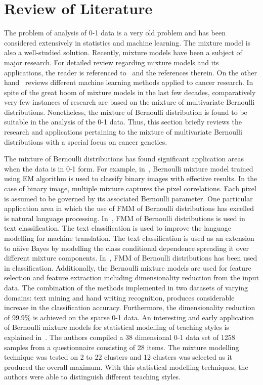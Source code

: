 \section[Review of Literature on Copy Number Analysis]{Review of Literature}
\label{s:mmbd}
The problem of analysis of 0-1 data is a very old problem and has been considered extensively in statistics and machine learning. The mixture model is also a well-studied solution. Recently, mixture models have been a subject of major research. For detailed review regarding mixture models and its applications, the reader is referenced to~\cite{mclachlanfmm, mixmodelsreview} and the references therein. On the other hand~\cite{thatreviewarticle} reviews different machine learning methods applied to cancer research. In spite of the great boom of mixture models in the last few decades, comparatively very few instances of research are based on the mixture of multivariate Bernoulli distributions. Nonetheless, the mixture of Bernoulli distribution is found to be suitable in the analysis of the 0-1 data. Thus, this section briefly reviews the research and applications pertaining to the mixture of multivariate Bernoulli distributions with a special focus on cancer genetics. 

The mixture of Bernoulli distributions has found significant application areas when the data is in 0-1 form. For example, in~\cite{binaryimages}, Bernoulli mixture model trained using EM algorithm is used to classify binary images with effective results. In the case of binary image, multiple mixture captures the pixel correlations. Each pixel is assumed to be governed by its associated Bernoulli parameter. One particular application area in which the use of FMM of Bernoulli distributions has excelled is natural language processing. In~\cite{textclassification}, FMM of Bernoulli distributions is used in text classification. The text classification is used to improve the language modelling for machine translation. The text classification is used as an extension to näive Bayes by modelling the class conditional dependence spreading it over different mixture components. In~\cite{textmining}, FMM of Bernoulli distributions has been used in classification. Additionally, the Bernoulli mixture models are used for feature selection and feature extraction including dimensionality reduction from the input data. The combination of the methods implemented in two datasets of varying domains: text mining and hand writing recognition, produces considerable increase in the classification accuracy. Furthermore, the dimensionality reduction of 99.9\% is achieved on the sparse 0-1 data. An interesting and early application of Bernoulli mixture models for statistical modelling of teaching styles is explained in~\cite{Aitkin1981}. The authors compiled a 38 dimensional 0-1 data set of 1258 samples from a questionnaire consisting of 28 items. The mixture modelling technique was tested on 2 to 22 clusters and 12 clusters was selected as it produced the overall maximum. With this statistical modelling techniques, the authors were able to distinguish  different teaching styles.


